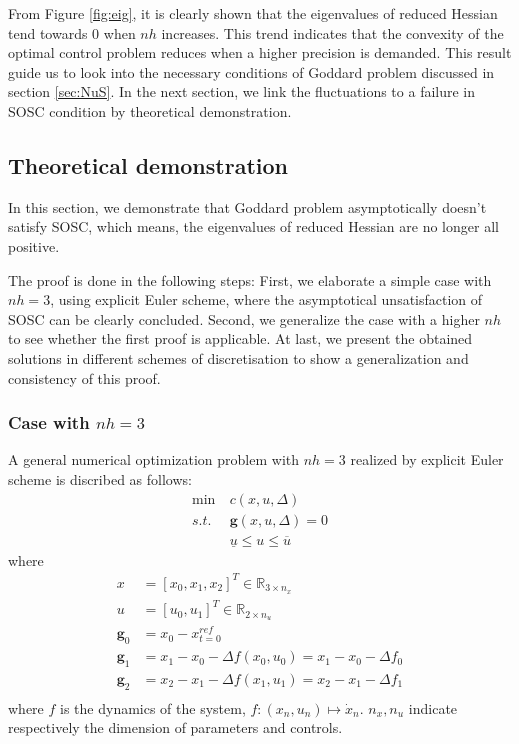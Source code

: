 \documentclass{article}
\begin{document}
From Figure \ref{fig:eig}, it is clearly shown that the eigenvalues of reduced Hessian tend towards 0 when $nh$ increases. This trend indicates that the convexity of the optimal control problem reduces when a higher precision is demanded. This result guide us to look into the necessary conditions of Goddard problem discussed in section \ref{sec:NuS}. In the next section, we link the fluctuations to a failure in SOSC condition by theoretical demonstration.

\subsection{Theoretical demonstration}
In this section, we demonstrate that Goddard problem asymptotically doesn't satisfy SOSC, which means, the eigenvalues of reduced Hessian are no longer all positive. 

The proof is done in the following steps: First, we elaborate a simple case with $nh=3$, using explicit Euler scheme, where the asymptotical unsatisfaction of SOSC can be clearly concluded. Second, we generalize the case with a higher $nh$ to see whether the first proof is applicable. At last, we present the obtained solutions in different schemes of discretisation to show a generalization and consistency of this proof.
\subsubsection{Case with $nh=3$}\label{ssc:nh3}
A general numerical optimization problem with $nh=3$ realized by explicit Euler scheme is discribed as follows:
\[
\begin{aligned}
\min \  &c(x,u,\Delta) \\ 
s.t. \ &\mathbf{g}(x,u,\Delta) = 0 \\
&\underline u \le u \le \overline u
\end{aligned}
\]
where
\[
\begin{aligned}
x &= [x_0,x_1,x_2]^T \in \mathbb{R}_{3\times n_x} \\
u &= [u_0,u_1]^T \in \mathbb{R} _{2\times n_u}\\ 
\mathbf{g}_0 &= x_0 - x_{t = 0}^{ref} \\ 
\mathbf{g}_1 &= x_1 - x_0 - \Delta f(x_0,u_0) =x_1 - x_0 - \Delta f_0\\ 
\mathbf{g}_2 &= x_2 - x_1 - \Delta f(x_1,u_1) =x_2 - x_1 - \Delta f_1\\ 
\end{aligned}
\]
where $f$ is the dynamics of the system, $f: (x_n,u_n)\mapsto \dot{x}_n$. $n_x,n_u$ indicate respectively the dimension of parameters and controls.
\end{document}
